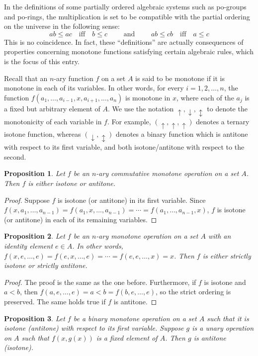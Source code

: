 \documentclass[12pt]{article}
\newtheorem{prop}{Proposition}
\begin{document}
In the definitions of some partially ordered algebraic systems such as po-groups and po-rings, the multiplication is set to be compatible with the partial ordering on the universe in the following sense:
$$ab \le ac \quad\mbox{iff}\quad b \le c \qquad\mbox{ and } \qquad ab \le cb \quad\mbox{iff}\quad a \le c$$
This is no coincidence.  In fact, these ``definitions'' are actually consequences of properties concerning monotone functions satisfying certain algebraic rules, which is the focus of this entry.

Recall that an $n$-ary function $f$ on a set $A$ is said to be monotone if it is monotone in each of its variables.  In other words, for every $i=1,2,\ldots,n$, the function $f(a_1,\ldots,a_{i-1},x,a_{i+1},\ldots,a_n)$ is monotone in $x$, where each of the $a_j$ is a fixed but arbitrary element of $A$.  We use the notation $\uparrow,\downarrow,\updownarrow$ to denote the monotonicity of each variable in $f$.  For example, $(\uparrow,\uparrow,\uparrow)$ denotes a ternary isotone function, whereas $(\downarrow,\updownarrow)$ denotes a binary function which is antitone with respect to its first variable, and both isotone/antitone with respect to the second.

\begin{prop}  Let $f$ be an $n$-ary commutative monotone operation on a set $A$.  Then $f$ is either isotone or antitone.
\end{prop}
\begin{proof}  Suppose $f$ is isotone (or antitone) in its first variable.  Since $f(x,a_1,\ldots,a_{n-1}) = f(a_1,x,\ldots, a_{n-1}) = \cdots = f(a_1,\ldots,a_{n-1},x)$, $f$ is isotone (or antitone) in each of its remaining variables.
\end{proof}

\begin{prop}  Let $f$ be an $n$-ary monotone operation on a set $A$ with an identity element $e\in A$.  In other words, $f(x,e,\ldots, e) = f(e,x,\ldots,e) = \cdots = f(e,e,\ldots, x)=x$.  Then $f$ is either strictly isotone or strictly antitone.
\end{prop}
\begin{proof}  The proof is the same as the one before.  Furthermore, if $f$ is isotone and $a < b$, then $f(a,e,\ldots,e)=a<b=f(b,e,\ldots,e)$, so the strict ordering is preserved.  The same holds true if $f$ is antitone.
\end{proof}

\begin{prop}  Let $f$ be a binary monotone operation on a set $A$ such that it is isotone (antitone) with respect to its first variable.  Suppose $g$ is a unary operation on $A$ such that $f(x,g(x))$ is a fixed element of $A$.  Then $g$ is antitone (isotone).
\end{prop}
\end{document}
